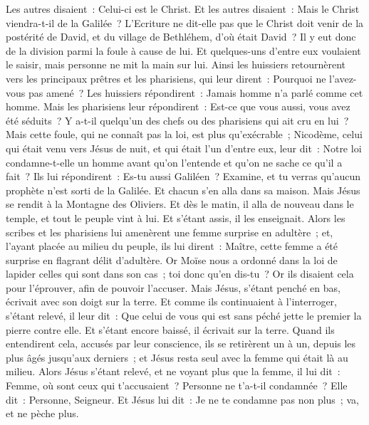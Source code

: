 \begin{multicols}{2}
Les autres disaient~: Celui-ci est le Christ. Et les autres disaient~: Mais le Christ viendra-t-il de la Galilée~?
L'Ecriture ne dit-elle pas que le Christ doit venir de la postérité de David, et du village de Bethléhem, d'où était David~?
Il y eut donc de la division parmi la foule à cause de lui.
Et quelques-uns d'entre eux voulaient le saisir, mais personne ne mit la main sur lui.
Ainsi les huissiers retournèrent vers les principaux prêtres et les pharisiens, qui leur dirent~: Pourquoi ne l'avez-vous pas amené~?
Les huissiers répondirent~: Jamais homme n'a parlé comme cet homme.
Mais les pharisiens leur répondirent~: Est-ce que vous aussi, vous avez été séduits~?
Y a-t-il quelqu'un des chefs ou des pharisiens qui ait cru en lui~?
Mais cette foule, qui ne connaît pas la loi, est plus qu'exécrable~;
Nicodème, celui qui était venu vers Jésus de nuit, et qui était l'un d'entre eux, leur dit~:
Notre loi condamne-t-elle un homme avant qu'on l'entende et qu'on ne sache ce qu'il a fait~?
Ils lui répondirent~: Es-tu aussi Galiléen~? Examine, et tu verras qu'aucun prophète n'est sorti de la Galilée.
Et chacun s'en alla dans sa maison.
\VerseOne{}Mais Jésus se rendit à la Montagne des Oliviers.
Et dès le matin, il alla de nouveau dans le temple, et tout le peuple vint à lui. Et s'étant assis, il les enseignait.
Alors les scribes et les pharisiens lui amenèrent une femme surprise en adultère~;
et, l'ayant placée au milieu du peuple, ils lui dirent~: Maître, cette femme a été surprise en flagrant délit d'adultère.
Or Moïse nous a ordonné dans la loi de lapider celles qui sont dans son cas~; toi donc qu'en dis-tu~?
Or ils disaient cela pour l'éprouver, afin de pouvoir l'accuser. Mais Jésus, s'étant penché en bas, écrivait avec son doigt sur la terre.
Et comme ils continuaient à l'interroger, s'étant relevé, il leur dit~: Que celui de vous qui est sans péché jette le premier la pierre contre elle.
Et s'étant encore baissé, il écrivait sur la terre.
Quand ils entendirent cela, accusés par leur conscience, ils se retirèrent un à un, depuis les plus âgés jusqu'aux derniers~; et Jésus resta seul avec la femme qui était là au milieu.
Alors Jésus s'étant relevé, et ne voyant plus que la femme, il lui dit~: Femme, où sont ceux qui t'accusaient~? Personne ne t'a-t-il condamnée~?
Elle dit~: Personne, Seigneur. Et Jésus lui dit~: Je ne te condamne pas non plus~; va, et ne pèche plus.

\end{multicols}
